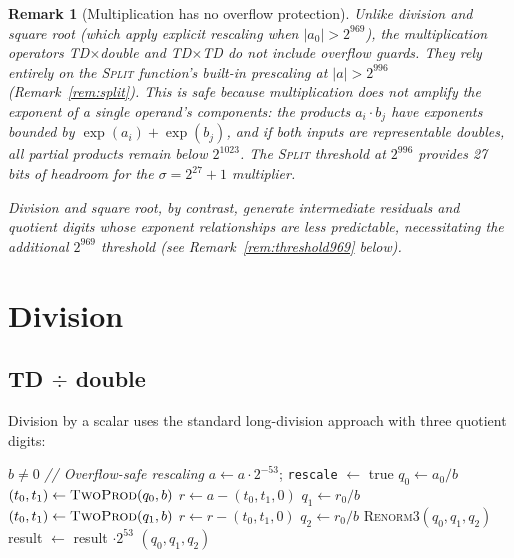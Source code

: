 \documentclass[11pt,a4paper]{article}
\newtheorem{remark}{Remark}
\begin{document}
\begin{remark}[Multiplication has no overflow protection]
\label{rem:mul-no-rescale}
Unlike division and square root (which apply explicit rescaling
when $|a_0| > 2^{969}$), the multiplication operators
TD$\times$double and TD$\times$TD do \emph{not} include overflow
guards.  They rely entirely on the \textsc{Split} function's
built-in prescaling at $|a| > 2^{996}$
(Remark~\ref{rem:split}).  This is safe because multiplication
does not amplify the exponent of a single operand's components:
the products $a_i \cdot b_j$ have exponents bounded by
$\exp(a_i) + \exp(b_j)$, and if both inputs are representable
doubles, all partial products remain below $2^{1023}$.  The
\textsc{Split} threshold at $2^{996}$ provides 27 bits of
headroom for the $\sigma = 2^{27} + 1$ multiplier.

Division and square root, by contrast, generate intermediate
residuals and quotient digits whose exponent relationships are
less predictable, necessitating the additional $2^{969}$ threshold
(see Remark~\ref{rem:threshold969} below).
\end{remark}


\section{Division}
\label{sec:div}

\subsection{TD $\div$ double}

Division by a scalar uses the standard long-division approach with
three quotient digits:
\begin{algorithmic}[1]
\Require $b \ne 0$
\State \textit{// Overflow-safe rescaling}
  \State $a \gets a \cdot 2^{-53}$;\; \texttt{rescale} $\gets$ true
\EndIf
\State $q_0 \gets a_0 / b$
\State $(t_0, t_1) \gets \textsc{TwoProd}(q_0, b)$
\State $r \gets a - (t_0, t_1, 0)$
\State $q_1 \gets r_0 / b$
\State $(t_0, t_1) \gets \textsc{TwoProd}(q_1, b)$
\State $r \gets r - (t_0, t_1, 0)$
\State $q_2 \gets r_0 / b$
\State \textsc{Renorm3}$(q_0, q_1, q_2)$
  \State result $\gets$ result $\cdot 2^{53}$
\EndIf
\State \Return $(q_0, q_1, q_2)$
\end{algorithmic}
\end{document}
